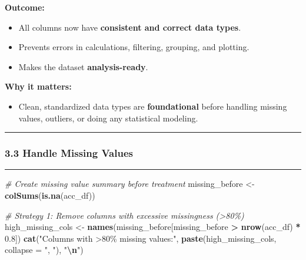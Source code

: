 \documentclass[
]{article}
\newenvironment{Shaded}{\begin{snugshade}}{\end{snugshade}}
\newcommand{\AttributeTok}[1]{\textcolor[rgb]{0.13,0.29,0.53}{#1}}
\newcommand{\CommentTok}[1]{\textcolor[rgb]{0.56,0.35,0.01}{\textit{#1}}}
\newcommand{\FloatTok}[1]{\textcolor[rgb]{0.00,0.00,0.81}{#1}}
\newcommand{\FunctionTok}[1]{\textcolor[rgb]{0.13,0.29,0.53}{\textbf{#1}}}
\newcommand{\NormalTok}[1]{#1}
\newcommand{\OtherTok}[1]{\textcolor[rgb]{0.56,0.35,0.01}{#1}}
\newcommand{\SpecialCharTok}[1]{\textcolor[rgb]{0.81,0.36,0.00}{\textbf{#1}}}
\newcommand{\StringTok}[1]{\textcolor[rgb]{0.31,0.60,0.02}{#1}}
\providecommand{\tightlist}{%
  \setlength{\itemsep}{0pt}\setlength{\parskip}{0pt}}
\begin{document}
\textbf{Outcome:}

\begin{itemize}
\tightlist
\item
  All columns now have \textbf{consistent and correct data types}.
\item
  Prevents errors in calculations, filtering, grouping, and plotting.
\item
  Makes the dataset \textbf{analysis-ready}.
\end{itemize}

\textbf{Why it matters:}

\begin{itemize}
\tightlist
\item
  Clean, standardized data types are \textbf{foundational} before
  handling missing values, outliers, or doing any statistical modeling.
\end{itemize}

\begin{center}\rule{0.5\linewidth}{0.5pt}\end{center}

\subsubsection{3.3 Handle Missing Values}\label{handle-missing-values}

\begin{center}\rule{0.5\linewidth}{0.5pt}\end{center}

\begin{Shaded}
\begin{Highlighting}[]
\CommentTok{\# Create missing value summary before treatment}
\NormalTok{missing\_before }\OtherTok{\textless{}{-}} \FunctionTok{colSums}\NormalTok{(}\FunctionTok{is.na}\NormalTok{(acc\_df))}

\CommentTok{\# Strategy 1: Remove columns with excessive missingness (\textgreater{}80\%)}
\NormalTok{high\_missing\_cols }\OtherTok{\textless{}{-}} \FunctionTok{names}\NormalTok{(missing\_before[missing\_before }\SpecialCharTok{\textgreater{}} \FunctionTok{nrow}\NormalTok{(acc\_df) }\SpecialCharTok{*} \FloatTok{0.8}\NormalTok{])}
\FunctionTok{cat}\NormalTok{(}\StringTok{"Columns with \textgreater{}80\% missing values:"}\NormalTok{, }\FunctionTok{paste}\NormalTok{(high\_missing\_cols, }\AttributeTok{collapse =} \StringTok{", "}\NormalTok{), }\StringTok{"}\SpecialCharTok{\textbackslash{}n}\StringTok{"}\NormalTok{)}
\end{Highlighting}
\end{Shaded}
\end{document}
